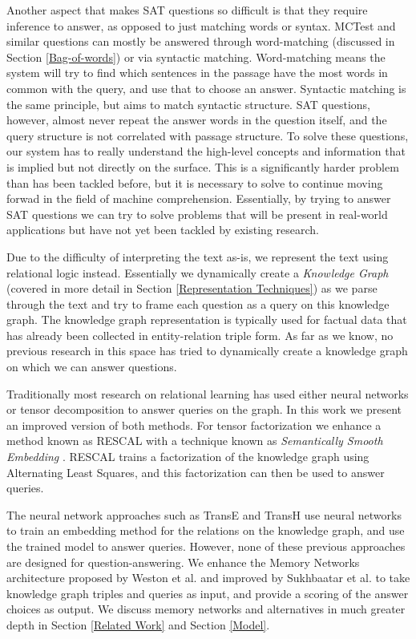 \documentclass[pageno]{jpaper}
\begin{document}
Another aspect that makes SAT questions so difficult is that they require
inference to answer, as opposed to just matching words or syntax. MCTest and
similar questions can mostly be answered through word-matching (discussed in
Section \ref{Bag-of-words}) or via syntactic matching. Word-matching means the
system will try to find which sentences in the passage have the most words in
common with the query, and use that to choose an answer. Syntactic matching is
the same principle, but aims to match syntactic structure. SAT questions,
however, almost never repeat the answer words in the question itself, and the
query structure is not correlated with passage structure. To solve these
questions, our system has to really understand the high-level concepts and
information that is implied but not directly on the surface. This is a
significantly harder problem than has been tackled before, but it is necessary
to solve to continue moving forwad in the field of machine comprehension.
Essentially, by trying to answer SAT questions we can try to solve problems that
will be present in real-world applications but have not yet been tackled by
existing research.

Due to the difficulty of interpreting the text as-is, we represent the text
using relational logic instead. Essentially we dynamically create a
\textit{Knowledge Graph} (covered in more detail in Section \ref{Representation
Techniques}) as we parse through the text and try to frame each question as a
query on this knowledge graph. The knowledge graph representation is typically
used for factual data that has already been collected in entity-relation triple
form. As far as we know, no previous research in this space has tried to
dynamically create a knowledge graph on which we can answer questions.

Traditionally most research on relational learning has used either neural
networks or tensor decomposition to answer queries on the graph. In this work we
present an improved version of both methods. For tensor factorization we enhance
a method known as RESCAL \cite{Bader2007, Nickel2011} with a technique known as
\textit{Semantically Smooth Embedding} \cite{Guo2015}. RESCAL trains a
factorization of the knowledge graph using Alternating Least Squares, and this
factorization can then be used to answer queries.

The neural network approaches such as TransE \cite{Bordes2013} and TransH
\cite{Wang2014} use neural networks to train an embedding method for the
relations on the knowledge graph, and use the trained model to answer queries.
However, none of these previous approaches are designed for question-answering.
We enhance the Memory Networks architecture proposed by Weston et al.
\cite{Weston2015a} and improved by Sukhbaatar et al. \cite{Sukhbaatar2015} to
take knowledge graph triples and queries as input, and provide a scoring of the
answer choices as output. We discuss memory networks and alternatives in much
greater depth in Section \ref{Related Work} and Section \ref{Model}.
\end{document}
